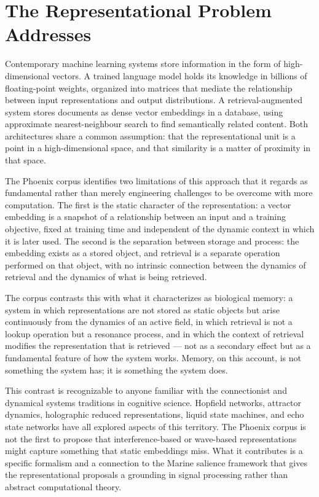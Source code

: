 \section{The Representational Problem \MEMeight{} Addresses}
\label{sec:mem8-problem}

Contemporary machine learning systems store information in the form
of high-dimensional vectors. A trained language model holds its
knowledge in billions of floating-point weights, organized into
matrices that mediate the relationship between input representations
and output distributions. A retrieval-augmented system stores
documents as dense vector embeddings in a database, using approximate
nearest-neighbour search to find semantically related content. Both
architectures share a common assumption: that the representational
unit is a point in a high-dimensional space, and that similarity is
a matter of proximity in that space.

The Phoenix corpus identifies two limitations of this approach that
it regards as fundamental rather than merely engineering challenges
to be overcome with more computation. The first is the static
character of the representation: a vector embedding is a snapshot
of a relationship between an input and a training objective, fixed
at training time and independent of the dynamic context in which
it is later used. The second is the separation between storage and
process: the embedding exists as a stored object, and retrieval
is a separate operation performed on that object, with no intrinsic
connection between the dynamics of retrieval and the dynamics of
what is being retrieved.

The corpus contrasts this with what it characterizes as biological
memory: a system in which representations are not stored as static
objects but arise continuously from the dynamics of an active field,
in which retrieval is not a lookup operation but a resonance process,
and in which the context of retrieval modifies the representation
that is retrieved --- not as a secondary effect but as a fundamental
feature of how the system works. Memory, on this account, is not
something the system has; it is something the system does.

This contrast is recognizable to anyone familiar with the
connectionist and dynamical systems traditions in cognitive science.
Hopfield networks, attractor dynamics, holographic reduced
representations, liquid state machines, and echo state networks
have all explored aspects of this territory. The Phoenix corpus
is not the first to propose that interference-based or wave-based
representations might capture something that static embeddings
miss. What it contributes is a specific formalism and a connection
to the Marine salience framework that gives the representational
proposals a grounding in signal processing rather than abstract
computational theory.

